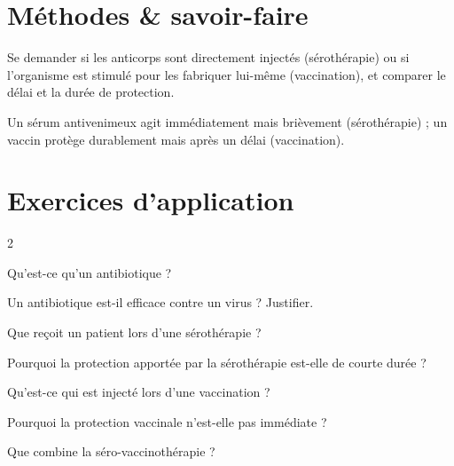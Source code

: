 \section{Méthodes \& savoir-faire}

Se demander si les anticorps sont directement injectés (sérothérapie) ou si
l'organisme est stimulé pour les fabriquer lui-même (vaccination), et comparer le
délai et la durée de protection.
\begin{exemple}
Un sérum antivenimeux agit immédiatement mais brièvement (sérothérapie) ; un vaccin
protège durablement mais après un délai (vaccination).
\end{exemple}

\section{Exercices d'application}
\begin{multicols}{2}

\exo{} Qu'est-ce qu'un antibiotique ?

\exo{} Un antibiotique est-il efficace contre un virus ? Justifier.

\exo{} Que reçoit un patient lors d'une sérothérapie ?

\exo{} Pourquoi la protection apportée par la sérothérapie est-elle de courte
durée ?

\exo{} Qu'est-ce qui est injecté lors d'une vaccination ?

\exo{} Pourquoi la protection vaccinale n'est-elle pas immédiate ?

\exo{} Que combine la séro-vaccinothérapie ?

\end{multicols}


